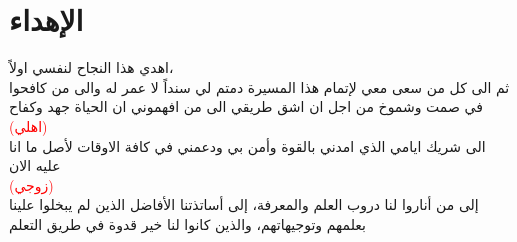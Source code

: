 \chapter*{الإهداء}

\begin{center}
اهدي هذا النجاح لنفسي اولاً،\\[1cm]
ثم الى كل من سعى معي لإتمام هذا المسيرة دمتم لي سنداً لا عمر له والى من كافحوا  في صمت وشموخ  من اجل ان اشق طريقي الى من افهموني ان الحياة جهد وكفاح\\
\textcolor{red}{(اهلي)}\\[1cm]
الى شريك ايامي الذي امدني بالقوة وأمن بي ودعمني في كافة الاوقات لأصل ما انا عليه الان \\
\textcolor{red}{(زوجي)}\\[1cm]
إلى من أناروا لنا دروب العلم والمعرفة، إلى أساتذتنا الأفاضل الذين لم يبخلوا علينا بعلمهم وتوجيهاتهم، والذين كانوا لنا خير قدوة في طريق التعلم
\end{center}




